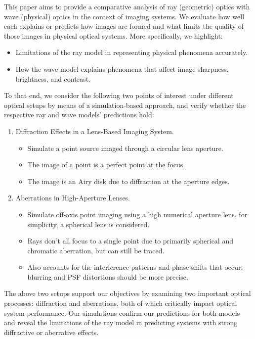 This paper aims to provide a comparative analysis of ray (geometric) optics with wave (physical) optics in the context of 
imaging systems. We evaluate how well each explains or predicts how images are formed and what limits the quality of those images in physical optical systems.   
More specifically, we highlight: 
\begin{itemize}
    \item Limitations of the ray model in representing physical phenomena accurately.
    \item How the wave model explains phenomena that affect image sharpness, brightness, and contrast.
\end{itemize}
To that end, we consider the following two points of interest under different optical setups by means of a simulation-based approach, and verify
whether the respective ray and wave models' predictions hold:  
\begin{enumerate} 
    \item Diffraction Effects in a Lens-Based Imaging System.
        \begin{itemize}
            \item {} Simulate a point source imaged through a circular lens aperture. 
            \item {} The image of a point is a perfect point at the focus.
            \item {} The image is an Airy disk due to diffraction at the aperture edges.
        \end{itemize}
    \item Aberrations in High-Aperture Lenses.
        \begin{itemize}
            \item {} Simulate off-axis point imaging using a high numerical aperture lens, for simplicity, a spherical lens is considered. 
            \item {} Rays don't all focus to a single point due to primarily spherical and chromatic aberration, but can still be traced.
            \item {} Also accounts for the interference patterns and phase shifts that occur; blurring and PSF distortions should be more precise. 
        \end{itemize}
\end{enumerate}
The above two setups support our objectives by examining two important optical processes: diffraction and aberrations, both of which critically impact optical system performance. Our simulations confirm 
our predictions for both models and reveal the limitations of the ray model in predicting systems with strong diffractive or aberrative effects.   

